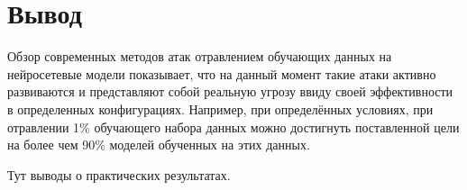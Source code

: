 \section*{Вывод}
Обзор современных методов атак отравлением обучающих данных на нейросетевые модели показывает, что на данный момент такие атаки активно развиваются и представляют собой реальную угрозу ввиду своей эффективности в определенных конфигурациях. Например, при определённых условиях, при отравлении 1\% обучающего набора данных можно достигнуть поставленной цели на более чем 90\% моделей обученных на этих данных.


Тут выводы о практических результатах.